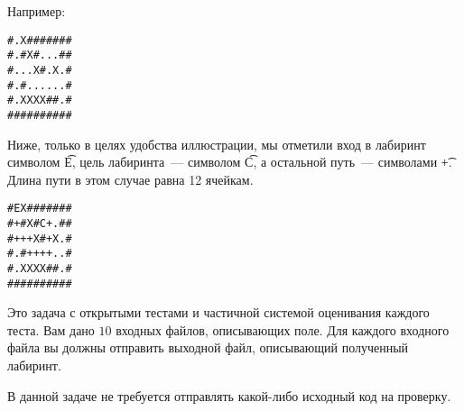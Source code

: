 Например:
\begin{verbatim}
#.X#######
#.#X#...##
#...X#.X.#
#.#......#
#.XXXX##.#
##########
\end{verbatim}

Ниже, только в целях удобства иллюстрации, мы отметили вход в лабиринт символом \t{E},
цель лабиринта~--- символом \t{C}, а остальной путь~--- символами \t{+}. Длина пути в этом
случае равна 12 ячейкам.
\begin{verbatim}
#EX#######
#+#X#C+.##
#+++X#+X.#
#.#++++..#
#.XXXX##.#
##########
\end{verbatim}

Это задача с открытыми тестами и частичной системой оценивания каждого теста. Вам дано $10$ входных файлов, описывающих поле. Для каждого входного файла вы должны отправить выходной файл, описывающий полученный лабиринт.

В данной задаче не требуется отправлять какой-либо исходный код на проверку.